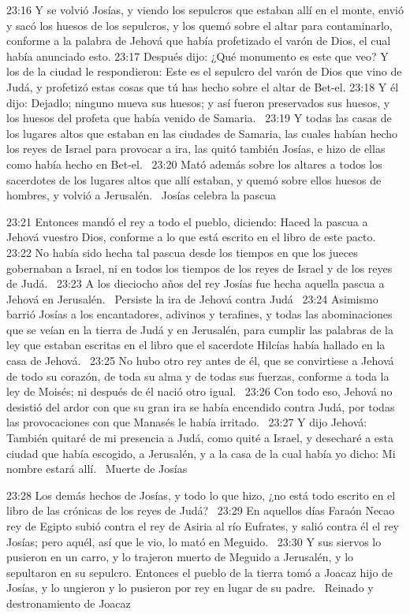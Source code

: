 23:16 Y se volvió Josías, y viendo los sepulcros que estaban allí en el monte, envió y sacó los huesos de los sepulcros, y los quemó sobre el altar para contaminarlo, conforme a la palabra de Jehová que había profetizado el varón de Dios, el cual había anunciado esto. 
23:17 Después dijo: ¿Qué monumento es este que veo? Y los de la ciudad le respondieron: Este es el sepulcro del varón de Dios que vino de Judá, y profetizó estas cosas que tú has hecho sobre el altar de Bet-el. 
23:18 Y él dijo: Dejadlo; ninguno mueva sus huesos; y así fueron preservados sus huesos, y los huesos del profeta que había venido de Samaria.  
23:19 Y todas las casas de los lugares altos que estaban en las ciudades de Samaria, las cuales habían hecho los reyes de Israel para provocar a ira, las quitó también Josías, e hizo de ellas como había hecho en Bet-el.  
23:20 Mató además sobre los altares a todos los sacerdotes de los lugares altos que allí estaban, y quemó sobre ellos huesos de hombres, y volvió a Jerusalén.  
Josías celebra la pascua  

23:21 Entonces mandó el rey a todo el pueblo, diciendo: Haced la pascua a Jehová vuestro Dios, conforme a lo que está escrito en el libro de este pacto.  
23:22 No había sido hecha tal pascua desde los tiempos en que los jueces gobernaban a Israel, ni en todos los tiempos de los reyes de Israel y de los reyes de Judá.  
23:23 A los dieciocho años del rey Josías fue hecha aquella pascua a Jehová en Jerusalén.  
Persiste la ira de Jehová contra Judá  
23:24 Asimismo barrió Josías a los encantadores, adivinos y terafines, y todas las abominaciones que se veían en la tierra de Judá y en Jerusalén, para cumplir las palabras de la ley que estaban escritas en el libro que el sacerdote Hilcías había hallado en la casa de Jehová.  
23:25 No hubo otro rey antes de él, que se convirtiese a Jehová de todo su corazón, de toda su alma y de todas sus fuerzas, conforme a toda la ley de Moisés; ni después de él nació otro igual.  
23:26 Con todo eso, Jehová no desistió del ardor con que su gran ira se había encendido contra Judá, por todas las provocaciones con que Manasés le había irritado.  
23:27 Y dijo Jehová: También quitaré de mi presencia a Judá, como quité a Israel, y desecharé a esta ciudad que había escogido, a Jerusalén, y a la casa de la cual había yo dicho: Mi nombre estará allí.  
Muerte de Josías  

23:28 Los demás hechos de Josías, y todo lo que hizo, ¿no está todo escrito en el libro de las crónicas de los reyes de Judá?  
23:29 En aquellos días Faraón Necao rey de Egipto subió contra el rey de Asiria al río Eufrates, y salió contra él el rey Josías; pero aquél, así que le vio, lo mató en Meguido.  
23:30 Y sus siervos lo pusieron en un carro, y lo trajeron muerto de Meguido a Jerusalén, y lo sepultaron en su sepulcro. Entonces el pueblo de la tierra tomó a Joacaz hijo de Josías, y lo ungieron y lo pusieron por rey en lugar de su padre.  
Reinado y destronamiento de Joacaz  

